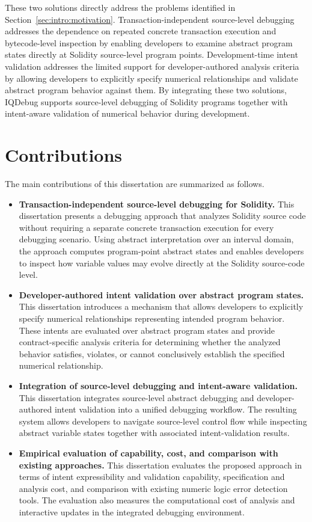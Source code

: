 \documentclass[11pt,oneside]{report}
\theoremstyle{plain}
\theoremstyle{definition}
\theoremstyle{remark}
\begin{document}
These two solutions directly address the problems identified in Section~\ref{sec:intro:motivation}.
Transaction-independent source-level debugging addresses the dependence on repeated concrete transaction execution and bytecode-level inspection by enabling developers to examine abstract program states directly at Solidity source-level program points.
Development-time intent validation addresses the limited support for developer-authored analysis criteria by allowing developers to explicitly specify numerical relationships and validate abstract program behavior against them.
By integrating these two solutions, IQDebug supports source-level debugging of Solidity programs together with intent-aware validation of numerical behavior during development.

\section{Contributions}\label{sec:intro:contributions}
The main contributions of this dissertation are summarized as follows.

\begin{itemize}
    \item \textbf{Transaction-independent source-level debugging for Solidity.}
    This dissertation presents a debugging approach that analyzes Solidity source code without requiring a separate concrete transaction execution for every debugging scenario.
    Using abstract interpretation over an interval domain, the approach computes program-point abstract states and enables developers to inspect how variable values may evolve directly at the Solidity source-code level.

    \item \textbf{Developer-authored intent validation over abstract program states.}
    This dissertation introduces a mechanism that allows developers to explicitly specify numerical relationships representing intended program behavior.
    These intents are evaluated over abstract program states and provide contract-specific analysis criteria for determining whether the analyzed behavior satisfies, violates, or cannot conclusively establish the specified numerical relationship.

    \item \textbf{Integration of source-level debugging and intent-aware validation.}
    This dissertation integrates source-level abstract debugging and developer-authored intent validation into a unified debugging workflow.
    The resulting system allows developers to navigate source-level control flow while inspecting abstract variable states together with associated intent-validation results.

    \item \textbf{Empirical evaluation of capability, cost, and comparison with existing approaches.}
    This dissertation evaluates the proposed approach in terms of intent expressibility and validation capability, specification and analysis cost, and comparison with existing numeric logic error detection tools.
    The evaluation also measures the computational cost of analysis and interactive updates in the integrated debugging environment.
\end{itemize}
\end{document}
